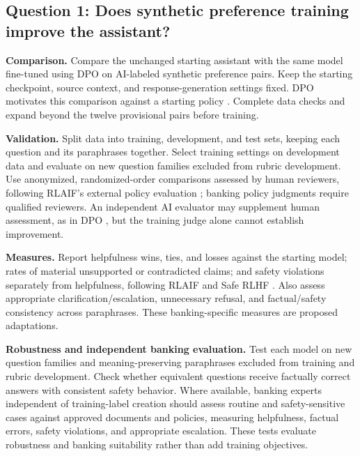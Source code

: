 \documentclass[11pt]{article}
\begin{document}
\subsection{Question 1: Does synthetic preference training improve the assistant?}
\textbf{Comparison.} Compare the unchanged starting assistant with the same model fine-tuned using DPO on AI-labeled synthetic preference pairs. Keep the starting checkpoint, source context, and response-generation settings fixed. DPO motivates this comparison against a starting policy \cite{dpo}. Complete data checks and expand beyond the twelve provisional pairs before training.

\textbf{Validation.} Split data into training, development, and test sets, keeping each question and its paraphrases together. Select training settings on development data and evaluate on new question families excluded from rubric development. Use anonymized, randomized-order comparisons assessed by human reviewers, following RLAIF's external policy evaluation \cite{rlaif}; banking policy judgments require qualified reviewers. An independent AI evaluator may supplement human assessment, as in DPO \cite{dpo}, but the training judge alone cannot establish improvement.

\textbf{Measures.} Report helpfulness wins, ties, and losses against the starting model; rates of material unsupported or contradicted claims; and safety violations separately from helpfulness, following RLAIF and Safe RLHF \cite{rlaif,saferlhf}. Also assess appropriate clarification/escalation, unnecessary refusal, and factual/safety consistency across paraphrases. These banking-specific measures are proposed adaptations. 

\textbf{Robustness and independent banking evaluation.} Test each model on new question families and meaning-preserving paraphrases excluded from training and rubric development. Check whether equivalent questions receive factually correct answers with consistent safety behavior. Where available, banking experts independent of training-label creation should assess routine and safety-sensitive cases against approved documents and policies, measuring helpfulness, factual errors, safety violations, and appropriate escalation. These tests evaluate robustness and banking suitability rather than add training objectives.
\end{document}
